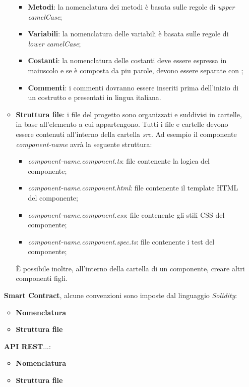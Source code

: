\begin{itemize}
\begin{itemize}
\begin{itemize}
            \item \textbf{Metodi}: la nomenclatura dei metodi è basata sulle regole di \textit{upper camelCase};
            \item \textbf{Variabili}: la nomenclatura delle variabili è basata sulle regole di \textit{lower camelCase};
            \item \textbf{Costanti}: la nomenclatura delle costanti deve essere espressa in maiuscolo e se è composta da piu parole, devono essere separate con \textit{\textunderscore};
            \item \textbf{Commenti}: i commenti dovranno essere inseriti prima dell’inizio di un  costrutto e presentati in
            lingua italiana.
        \end{itemize}
        \item \textbf{Struttura file}: i file del progetto sono organizzati e suddivisi in cartelle, in base all'elemento a cui appartengono. \newline
        Tutti i file e cartelle devono essere contenuti all'interno della cartella \textit{src}. \newline
        Ad esempio il componente \textit{component-name} avrà la seguente struttura:
        \begin{itemize}
            \item \textit{component-name.component.ts}: file contenente la logica del componente;
            \item \textit{component-name.component.html}: file contenente il template HTML del componente;
            \item \textit{component-name.component.css}: file contenente gli stili CSS del componente;
            \item \textit{component-name.component.spec.ts}: file contenente i test del componente;
        \end{itemize}
        È possibile inoltre, all'interno della cartella di un componente, creare altri componenti figli.
    \end{itemize}
    \textbf{Smart Contract}, alcune convenzioni sono imposte dal linguaggio \textit{Solidity}:
    \begin{itemize}
        \item \textbf{Nomenclatura}
        \item \textbf{Struttura file}
    \end{itemize}
    \textbf{API REST}...:
    \begin{itemize}
        \item \textbf{Nomenclatura}
        \item \textbf{Struttura file}
    \end{itemize}
\end{itemize}

